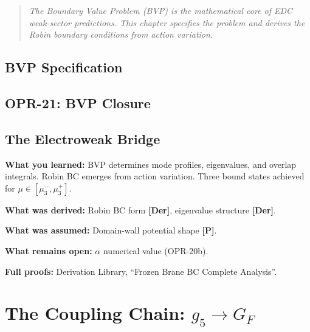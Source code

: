 \documentclass[11pt,a4paper]{book}
\theoremstyle{definition}
\theoremstyle{remark}
\newcommand{\tagDer}{\textcolor{derivedColor}{\textbf{[Der]}}}
\newcommand{\tagP}{\textcolor{postulatedColor}{\textbf{[P]}}}
\begin{document}
\begin{quote}
\textit{The Boundary Value Problem (BVP) is the mathematical core of EDC weak-sector
predictions. This chapter specifies the problem and derives the Robin boundary
conditions from action variation.}
\end{quote}

\section{BVP Specification}
\label{sec:bvp_spec}



\section{OPR-21: BVP Closure}
\label{sec:opr21}



\section{The Electroweak Bridge}
\label{sec:electroweak_bridge}



\begin{chapterRecap}
\textbf{What you learned:} BVP determines mode profiles, eigenvalues, and overlap
integrals. Robin BC emerges from action variation. Three bound states achieved
for $\mu \in [\mu_3^-, \mu_3^+]$.

\textbf{What was derived:} Robin BC form \tagDer{}, eigenvalue structure \tagDer{}.

\textbf{What was assumed:} Domain-wall potential shape \tagP{}.

\textbf{What remains open:} $\alpha$ numerical value (OPR-20b).

\textbf{Full proofs:} Derivation Library, ``Frozen Brane BC Complete Analysis''.
\end{chapterRecap}

\chapter{The Coupling Chain: $g_5 \to G_F$}
\label{ch:coupling_chain}
\label{ch:gf_derivation}%
\end{document}
